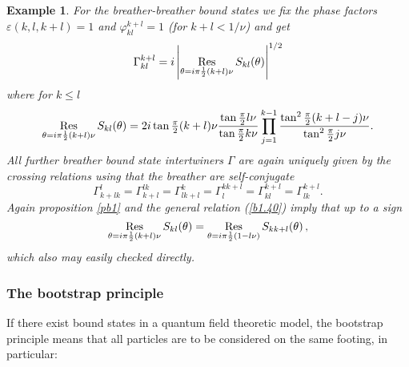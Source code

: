 \documentclass[a4paper,a4paper]{article}
\newtheorem{example}{Example}
\begin{document}
\begin{example}
For the breather-breather bound states we fix the phase factors $\varepsilon
(k,l,k+l)=1$ and $\varphi _{kl}^{k+l}=1$ (for $k+l<1/\nu $) and get 
\[
\Gamma _{kl}^{k+l}=i\left| \mathop{\rm Res}_{\theta =i\pi \frac{1}{2}%
(k+l)\nu }S_{kl}(\theta )\right| ^{1/2} 
\]
where for $k\leq l$ 
\[
\mathop{\rm Res}_{\theta =i\pi \frac{1}{2}(k+l)\nu }S_{kl}(\theta )=2i\tan 
\tfrac{\pi }{2}(k+l)\nu \frac{\tan \tfrac{\pi }{2}l\nu }{\tan \tfrac{\pi }{2}%
k\nu }\prod_{j=1}^{k-1}\frac{\tan ^{2}\tfrac{\pi }{2}(k+l-j)\nu }{\tan ^{2}%
\tfrac{\pi }{2}j\nu }. 
\]
All further breather bound state intertwiners $\Gamma $ are again uniquely
given by the crossing relations using that the breather are self-conjugate 
\[
\Gamma _{k+lk}^{l}=\Gamma _{k+l}^{lk}=\Gamma _{lk+l}^{k}=\Gamma
_{l}^{kk+l}=\Gamma _{kl}^{k+l}=\Gamma _{lk}^{k+l}. 
\]
Again proposition \ref{pb1} and the general relation (\ref{b1.40}) imply
that up to a sign 
\[
\mathop{\rm Res}_{\theta =i\pi \frac{1}{2}(k+l)\nu }S_{kl}(\theta )=%
\mathop{\rm Res}_{\theta =i\pi \frac{1}{2}(1-l\nu )}S_{kk+l}(\theta )\,, 
\]
which also may easily checked directly.
\end{example}

\subsubsection{The \textbf{bootstrap principle}}

If there exist bound states in a quantum field theoretic model, the
bootstrap principle means that all particles are to be considered on the
same footing, in particular:
\end{document}
